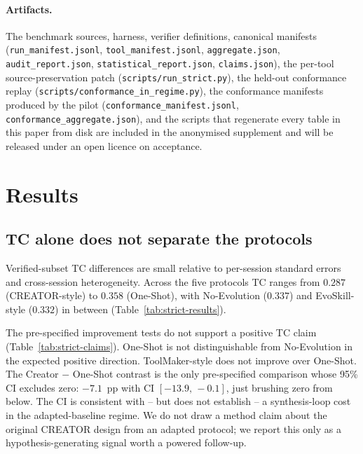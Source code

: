 \documentclass[sigconf,anonymous,review,natbib=false]{acmart}
\begin{document}
\paragraph{Artifacts.}
The benchmark sources, harness, verifier definitions, canonical manifests (\texttt{run\_manifest.jsonl}, \texttt{tool\_manifest.jsonl}, \texttt{aggregate.json}, \texttt{audit\_report.json}, \texttt{statistical\_report.json}, \texttt{claims.json}), the per-tool source-preservation patch (\texttt{scripts/run\_strict.py}), the held-out conformance replay (\texttt{scripts/conformance\_in\_regime.py}), the conformance manifests produced by the pilot (\texttt{conformance\_manifest.jsonl}, \texttt{conformance\_aggregate.json}), and the scripts that regenerate every table in this paper from disk are included in the anonymised supplement and will be released under an open licence on acceptance.

\section{Results}
\label{sec:results}



\subsection{TC alone does not separate the protocols}

Verified-subset TC differences are small relative to per-session standard errors and cross-session heterogeneity. Across the five protocols TC ranges from $0.287$ (CREATOR-style) to $0.358$ (One-Shot), with No-Evolution ($0.337$) and EvoSkill-style ($0.332$) in between (Table~\ref{tab:strict-results}).

The pre-specified improvement tests do not support a positive TC claim (Table~\ref{tab:strict-claims}). One-Shot is not distinguishable from No-Evolution in the expected positive direction. ToolMaker-style does not improve over One-Shot. The Creator $-$ One-Shot contrast is the only pre-specified comparison whose 95\% CI excludes zero: $-7.1$~pp with CI $[-13.9,\,-0.1]$, just brushing zero from below. The CI is consistent with -- but does not establish -- a synthesis-loop cost in the adapted-baseline regime. We do not draw a method claim about the original CREATOR design from an adapted protocol; we report this only as a hypothesis-generating signal worth a powered follow-up.


\end{document}
